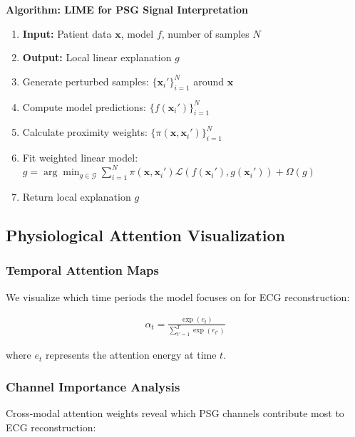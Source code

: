 \documentclass[11pt]{article}
\begin{document}
\textbf{Algorithm: LIME for PSG Signal Interpretation}

\begin{enumerate}
\item \textbf{Input:} Patient data $\mathbf{x}$, model $f$, number of samples $N$
\item \textbf{Output:} Local linear explanation $g$
\item Generate perturbed samples: $\{\mathbf{x}_i'\}_{i=1}^N$ around $\mathbf{x}$
\item Compute model predictions: $\{f(\mathbf{x}_i')\}_{i=1}^N$
\item Calculate proximity weights: $\{\pi(\mathbf{x}, \mathbf{x}_i')\}_{i=1}^N$
\item Fit weighted linear model: $g = \arg\min_{g \in \mathcal{G}} \sum_{i=1}^N \pi(\mathbf{x}, \mathbf{x}_i') \mathcal{L}(f(\mathbf{x}_i'), g(\mathbf{x}_i')) + \Omega(g)$
\item Return local explanation $g$
\end{enumerate}

\subsection{Physiological Attention Visualization}

\subsubsection{Temporal Attention Maps}
We visualize which time periods the model focuses on for ECG reconstruction:

\begin{align}
\alpha_t = \frac{\exp(e_t)}{\sum_{t'=1}^T \exp(e_{t'})}
\end{align}

where $e_t$ represents the attention energy at time $t$.

\subsubsection{Channel Importance Analysis}
Cross-modal attention weights reveal which PSG channels contribute most to ECG reconstruction:
\end{document}
